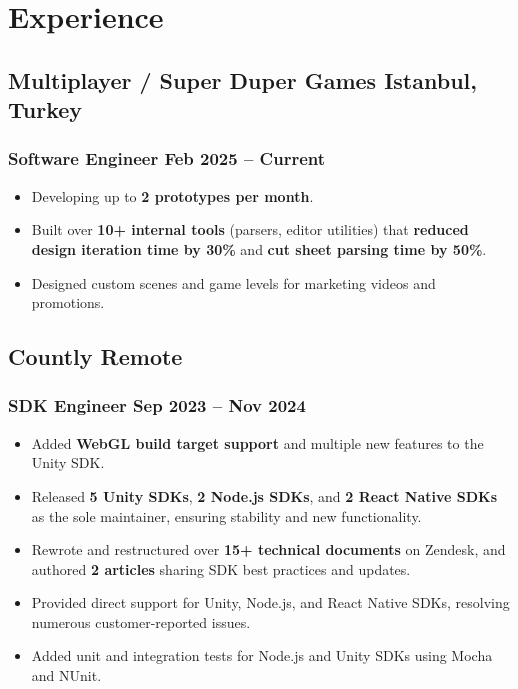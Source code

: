 \documentclass[11pt]{article}
\newcommand{\rside}[1]{
  \hfill {\normalfont\color{accent} #1}%
}
\begin{document}
\section{Experience}

\subsection{Multiplayer / Super Duper Games \rside{Istanbul, Turkey}}
\subsubsection{Software Engineer \rside{Feb 2025 -- Current}}
\begin{itemize}
  \item Developing up to \textbf{2 prototypes per month}.
  \item Built over \textbf{10+ internal tools} (parsers, editor utilities) that \textbf{reduced design iteration time by 30\%} and \textbf{cut sheet parsing time by 50\%}.
  \item Designed custom scenes and game levels for marketing videos and promotions.
\end{itemize}

\subsection{Countly \rside{Remote}}
\subsubsection{SDK Engineer \rside{Sep 2023 -- Nov 2024}}
\begin{itemize}
  \item Added \textbf{WebGL build target support} and multiple new features to the Unity SDK.
  \item Released \textbf{5 Unity SDKs}, \textbf{2 Node.js SDKs}, and \textbf{2 React Native SDKs} as the sole maintainer, ensuring stability and new functionality.
  \item Rewrote and restructured over \textbf{15+ technical documents} on Zendesk, and authored \textbf{2 articles} sharing SDK best practices and updates.
  \item Provided direct support for Unity, Node.js, and React Native SDKs, resolving numerous customer-reported issues.
  \item Added unit and integration tests for Node.js and Unity SDKs using Mocha and NUnit.
\end{itemize}
\end{document}
